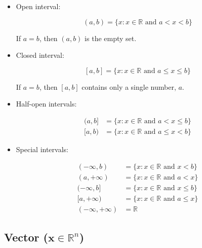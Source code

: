 \documentclass{article}
\begin{document}
        \begin{itemize}
          \item Open interval:

                $$(a, b) = \{x : x \in \mathbb{R} \text{ and } a < x < b \}$$

                If $a = b$, then $(a, b)$ is the empty set.

          \item Closed interval:

                $$
                  [a, b]
                    = \{x : x \in \mathbb{R} \text{ and } a \leq x \leq b \}
                $$

                If $a = b$, then $[a, b]$ contains only a single number,
                $a$.

          \item Half-open intervals:

                \begin{align*}
                  (a, b]
                    & = \{x : x \in \mathbb{R} \text{ and } a < x \leq b \} \\
                  [a, b)
                    & = \{x : x \in \mathbb{R} \text{ and } a \leq x < b \}
                \end{align*}

          \item Special intervals:

                \begin{align*}
                  (-\infty, b)
                    & = \{x : x \in \mathbb{R} \text{ and } x < b\} \\
                  (a, +\infty)
                    & = \{x : x \in \mathbb{R} \text{ and } a < x\} \\
                  (-\infty, b]
                    & = \{x : x \in \mathbb{R} \text{ and } x \leq b\} \\
                  [a, +\infty)
                    & = \{x : x \in \mathbb{R} \text{ and } a \leq x\} \\
                  (-\infty, +\infty) & = \mathbb{R}
                \end{align*}
        \end{itemize}

      \subsection{Vector ($\mathbf{x} \in \mathbb{R}^n$)}
\end{document}
